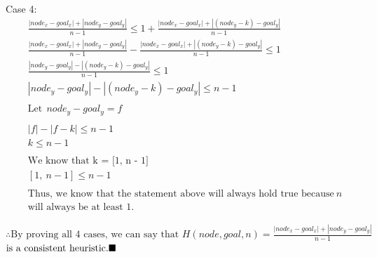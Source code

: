 \documentclass[a4paper]{article}
\begin{document}
\begin{sloppypar}
\begin{enumerate}[start=6,label=Q\arabic*,left=0pt]
    Case 4:
    \begin{align*}
        &\frac{|node_x - goal_x| + |node_y - goal_y|}{n - 1} \leq 1 + \frac{|node_x - goal_x| + |(node_y - k) - goal_y|}{n - 1} \\
        &\frac{|node_x - goal_x| + |node_y - goal_y|}{n - 1} - \frac{|node_x - goal_x| + |(node_y - k) - goal_y|}{n - 1} \leq 1 \\
        &\frac{|node_y - goal_y| - |(node_y - k) - goal_y|}{n - 1} \leq 1 \\
        &|node_y - goal_y| - |(node_y - k) - goal_y| \leq n - 1 \\\\
        &\text{Let} \:\: node_y - goal_y = f \\\\
        &|f| - |f - k| \leq n - 1 \\
        &k \leq n - 1 \\\\
        &\text{We know that k = [1, n - 1]} \\
        &[1, \: n - 1] \leq n - 1 \\\\
        &\text{Thus, we know that the statement above will always hold true because} \: n \: \\
        &\text{will always be at least 1.}
    \end{align*} 

    $\therefore \text{By proving all 4 cases, we can say that } H(node, goal, n) = \frac{|node_x - goal_x| + |node_y - goal_y|}{n - 1}$ \\ 
    $\text{is a consistent heuristic.} \hfill \blacksquare$
    

\end{enumerate}
\end{sloppypar}
\end{document}
